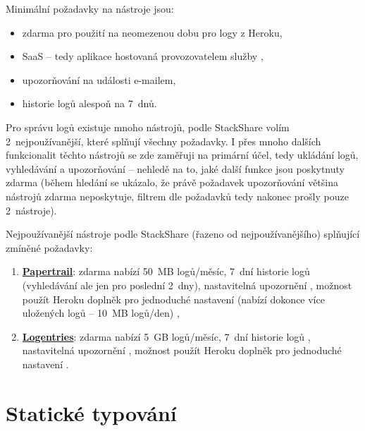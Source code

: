 Minimální požadavky na nástroje jsou:
\begin{itemize}
    \item zdarma pro použití na neomezenou dobu pro logy z Heroku,
    \item SaaS -- tedy aplikace hostovaná provozovatelem služby \cite{oracle-saas},
    \item upozorňování na události e-mailem,
    \item historie logů alespoň na 7~dnů.
\end{itemize}

Pro správu logů existuje mnoho nástrojů, podle StackShare \cite{stackshare-log} volím 2~nejpoužívanější, které splňují všechny požadavky. I přes mnoho dalších funkcionalit těchto nástrojů se zde zaměřuji na primární účel, tedy ukládání logů, vyhledávání a upozorňování -- nehledě na to, jaké další funkce jsou poskytnuty zdarma (během hledání se ukázalo, že právě požadavek upozorňování většina nástrojů zdarma neposkytuje, filtrem dle požadavků tedy nakonec prošly pouze 2~nástroje).

Nejpoužívanější nástroje podle StackShare (řazeno od nejpoužívanějšího) \cite{stackshare-log} splňující zmíněné požadavky:
\begin{enumerate}
    \item \href{https://www.papertrail.com/}{\textbf{Papertrail}}: zdarma nabízí 50~MB logů/měsíc, 7~dní historie logů (vyhledávání ale jen pro poslední 2~dny), nastavitelná upozornění \cite{papertrail-pricing}, možnost použít Heroku doplněk pro jednoduché nastavení (nabízí dokonce více uložených logů -- 10~MB logů/den) \cite{heroku-papertrail},
    \item \href{https://logentries.com/}{\textbf{Logentries}}: zdarma nabízí 5~GB logů/měsíc, 7~dní historie logů \cite{logentries-pricing}, nastavitelná upozornění \cite{logentries-pricing2}, možnost použít Heroku doplněk pro jednoduché nastavení \cite{heroku-logentries}.
\end{enumerate}


\section{Statické typování}\label{sec:staticketypovani}

